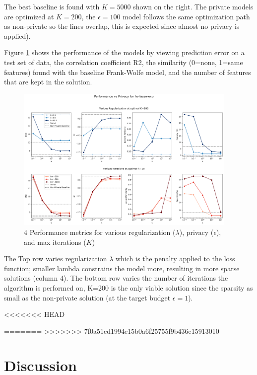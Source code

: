 \documentclass[12pt,letterpaper]{article}
\begin{document}
The best baseline is found with $K=5000$ shown on the right. The private models are optimized at $K=200$, the $\epsilon=100$ model follows the same optimization path as non-private so the lines overlap, this is expected since almost no privacy is applied).

Figure \ref{fig:lasso_results} shows the performance of the models by viewing prediction error on a test set of data, the correlation coefficient R2, the similarity (0=none, 1=same features) found with the baseline Frank-Wolfe model, and the number of features that are kept in the solution.

\begin{figure}[H]
    \centering
    \includegraphics[width=0.95\textwidth]{figure/lasso_results.png}
    \caption{4 Performance metrics for various regularization ($\lambda$), privacy ($\epsilon$), and max iterations ($K$)}
    \label{fig:lasso_results}
\end{figure}

The Top row varies regularization $\lambda$ which is the penalty applied to the loss function; smaller lambda constrains the model more, resulting in more sparse solutions (column 4). The bottom row varies the number of iterations the algorithm is performed on, K=200 is the only viable solution since the sparsity as small as the non-private solution (at the target budget $\epsilon=1$).

<<<<<<< HEAD

=======
>>>>>>> 7f0a51cd1994e15b0a6f25755f9b436e15913010


\section{Discussion}
\end{document}
